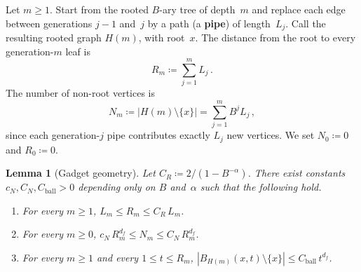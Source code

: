 \documentclass[11pt]{amsart}
\theoremstyle{plain}
\newtheorem{lemma}[theorem]{Lemma}
\theoremstyle{definition}
\begin{document}
	Let $m\geq 1$.  Start from the rooted $B$-ary tree of depth~$m$ and replace each edge between generations $j{-}1$ and~$j$ by a path (a \textbf{pipe}) of length~$L_j$.  Call the resulting rooted graph $H(m)$, with root~$x$.  The distance from the root to every generation-$m$ leaf is
	\begin{equation}
		R_m\coloneqq\sum_{j=1}^m L_j\,.
	\end{equation}
	The number of non-root vertices is
	\begin{equation}
		N_m\coloneqq|H(m)\setminus\{x\}|
		=\sum_{j=1}^m B^j L_j\,,
	\end{equation}
	since each generation-$j$ pipe contributes exactly $L_j$ new vertices.  We set $N_0\coloneqq 0$ and $R_0\coloneqq 0$.
	
	\begin{lemma}[Gadget geometry]\label{lem:rec-geometry}
		Let $C_R\coloneqq 2/(1-B^{-\alpha})$.  There exist constants $c_N, C_N, C_{\mathrm{ball}}>0$ depending only on $B$ and~$\alpha$ such that the following hold.
		\begin{enumerate}
			\item[\textup{(a)}] For every $m\geq 1$, $L_m\leq R_m\leq C_R\,L_m$.
			\item[\textup{(b)}] For every $m\geq 0$, $c_N\,R_m^{d_f}\leq N_m\leq C_N\,R_m^{d_f}$.
			\item[\textup{(c)}] For every $m\geq 1$ and every $1\leq t\leq R_m$, $|B_{H(m)}(x,t)\setminus\{x\}|\leq C_{\mathrm{ball}}\,t^{d_f}$.
		\end{enumerate}
	\end{lemma}
	
\end{document}
